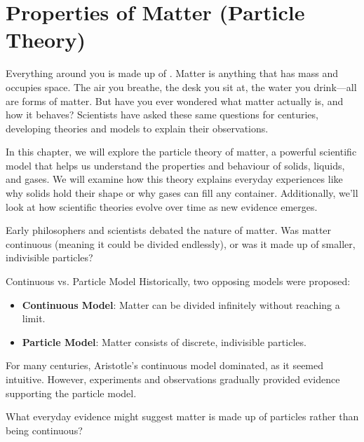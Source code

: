 \chapter{Properties of Matter (Particle Theory)}

\FloatBarrier

Everything around you is made up of . Matter is anything that has mass and occupies space. The air you breathe, the desk you sit at, the water you drink—all are forms of matter. But have you ever wondered what matter actually is, and how it behaves? Scientists have asked these same questions for centuries, developing theories and models to explain their observations.

In this chapter, we will explore the particle theory of matter, a powerful scientific model that helps us understand the properties and behaviour of solids, liquids, and gases. We will examine how this theory explains everyday experiences like why solids hold their shape or why gases can fill any container. Additionally, we'll look at how scientific theories evolve over time as new evidence emerges.

\FloatBarrier

Early philosophers and scientists debated the nature of matter. Was matter continuous (meaning it could be divided endlessly), or was it made up of smaller, indivisible particles?

\begin{keyconcept}{Continuous vs. Particle Model}
Historically, two opposing models were proposed:
\begin{itemize}
    \item \textbf{Continuous Model}: Matter can be divided infinitely without reaching a limit.
    \item \textbf{Particle Model}: Matter consists of discrete, indivisible particles.
\end{itemize}
\end{keyconcept}

For many centuries, Aristotle's continuous model dominated, as it seemed intuitive. However, experiments and observations gradually provided evidence supporting the particle model.

\begin{stopandthink}
What everyday evidence might suggest matter is made up of particles rather than being continuous?
\end{stopandthink}

